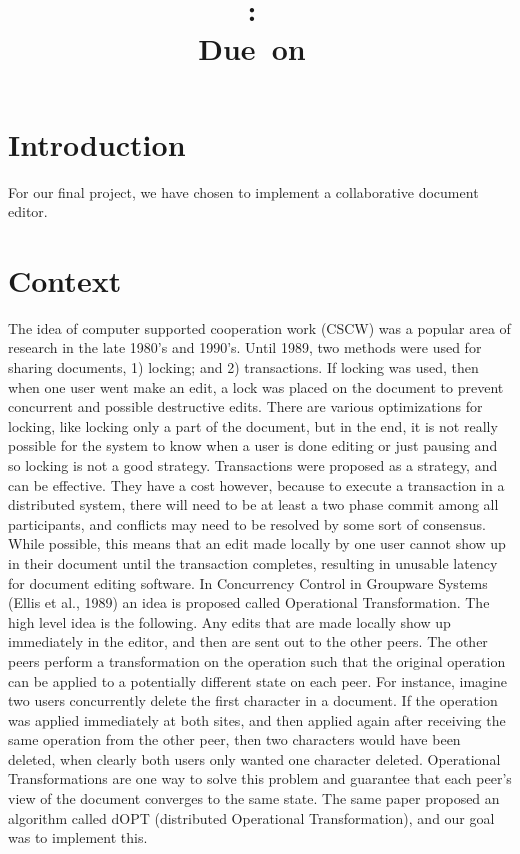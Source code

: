 \documentclass{article}
\title{
    \vspace{2in}
    \textmd{\textbf{\hmwkClass:\ \hmwkTitle}}\\
    \normalsize\vspace{0.1in}\small{Due\ on\ \hmwkDueDate}\\
    \vspace{0.1in}\large{\textit{\hmwkClassInstructor}}
}
\author{\hmwkAuthorName}
\date{}
\begin{document}
\maketitle

\pagebreak

\section{Introduction}
For our final project, we have chosen to implement a collaborative document editor.

\section{Context}
The idea of computer supported cooperation work (CSCW) was a popular area of research in the late 1980's and 1990's. Until 1989, two methods were used for sharing documents, 1) locking; and 2) transactions. If locking was used, then when one user went make an edit, a lock was placed on the document to prevent concurrent and possible destructive edits. There are various optimizations for locking, like locking only a part of the document, but in the end, it is not really possible for the system to know when a user is done editing or just pausing and so locking is not a good strategy. Transactions were proposed as a strategy, and can be effective. They have a cost however, because to execute a transaction in a distributed system, there will need to be at least a two phase commit among all participants, and conflicts may need to be resolved by some sort of consensus. While possible, this means that an edit made locally by one user cannot show up in their document until the transaction completes, resulting in unusable latency for document editing software. In Concurrency Control in Groupware Systems (Ellis et al., 1989) an idea is proposed called Operational Transformation. The high level idea is the following. Any edits that are made locally show up immediately in the editor, and then are sent out to the other peers. The other peers perform a transformation on the operation such that the original operation can be applied to a potentially different state on each peer. For instance, imagine two users concurrently delete the first character in a document. If the operation was applied immediately at both sites, and then applied again after receiving the same operation from the other peer, then two characters would have been deleted, when clearly both users only wanted one character deleted. Operational Transformations are one way to solve this problem and guarantee that each peer's view of the document converges to the same state. The same paper proposed an algorithm called dOPT (distributed Operational Transformation), and our goal was to implement this.\\
\end{document}
